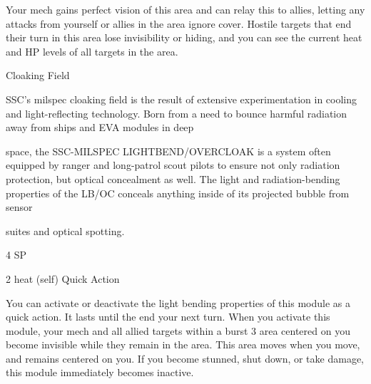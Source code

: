          Your mech gains perfect vision of this area and can relay this to allies, letting any attacks  
         from yourself or allies in the area ignore cover. Hostile targets that end their turn in this  
          area lose invisibility or hiding, and you can see the current heat and HP levels of all  
         targets in the area.
 

Cloaking Field  

SSC’s milspec cloaking field is the result of extensive experimentation in cooling and light-reflecting  
technology. Born from a need to bounce harmful radiation away from ships and EVA modules in deep  

space, the SSC-MILSPEC LIGHTBEND/OVERCLOAK is a system often equipped by ranger and long-patrol  
scout pilots to ensure not only radiation protection, but optical concealment as well. The light and  
radiation-bending properties of the LB/OC conceals anything inside of its projected bubble from sensor  

suites and optical spotting.   

4 SP  

2 heat (self)  
Quick Action
 
You can activate or deactivate the light bending properties of this module as a quick action. It  
lasts until the end your next turn. When you activate this module, your mech and all allied targets  
within a burst 3 area centered on you become invisible while they remain in the area. This area  
moves when you move, and remains centered on you. If you become stunned, shut down, or  
take damage, this module immediately becomes inactive.
 

                                                                                                                        
